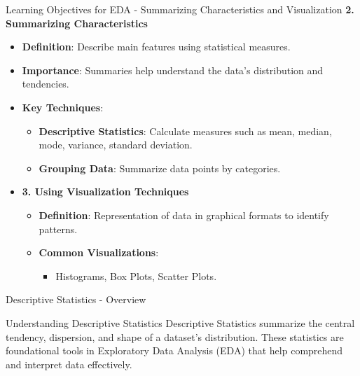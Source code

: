 \documentclass[aspectratio=169]{beamer}
\begin{document}
\begin{frame}[fragile]{Learning Objectives for EDA - Summarizing Characteristics and Visualization}
    \textbf{2. Summarizing Characteristics}
    \begin{itemize}
        \item \textbf{Definition}: Describe main features using statistical measures.
        \item \textbf{Importance}: Summaries help understand the data’s distribution and tendencies.
        \item \textbf{Key Techniques}:
        \begin{itemize}
            \item \textbf{Descriptive Statistics}: Calculate measures such as mean, median, mode, variance, standard deviation.
            \item \textbf{Grouping Data}: Summarize data points by categories.
        \end{itemize}
        \item \textbf{3. Using Visualization Techniques}
        \begin{itemize}
            \item \textbf{Definition}: Representation of data in graphical formats to identify patterns.
            \item \textbf{Common Visualizations}:
            \begin{itemize}
                \item Histograms, Box Plots, Scatter Plots.
            \end{itemize}
        \end{itemize}
    \end{itemize}
\end{frame}

\begin{frame}[fragile]{Descriptive Statistics - Overview}
    \begin{block}{Understanding Descriptive Statistics}
        Descriptive Statistics summarize the central tendency, dispersion, and shape of a dataset's distribution. These statistics are foundational tools in Exploratory Data Analysis (EDA) that help comprehend and interpret data effectively.
    \end{block}
\end{frame}
\end{document}
